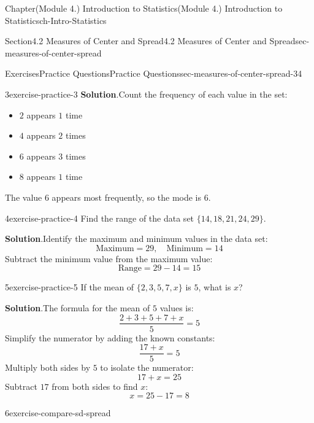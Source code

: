 \documentclass[oneside,10pt,]{book}
\newcommand{\blocktitlefont}{\relax}
\newcommand{\ptxlistdisc}{\raisebox{0.3ex}{\textbullet}}
\begin{document}
\begin{chapterptx}{Chapter}{(Module 4.) Introduction to Statistics}{}{(Module 4.) Introduction to Statistics}{}{}{ch-Intro-Statistics}
\begin{sectionptx}{Section}{4.2 Measures of Center and Spread}{}{4.2 Measures of Center and Spread}{}{}{sec-measures-of-center-spread}
\begin{exercises-subsection}{Exercises}{Practice Questions}{}{Practice Questions}{}{}{sec-measures-of-center-spread-34}
\begin{divisionexercise}{3}{}{}{exercise-practice-3}
\noindent\textbf{\blocktitlefont Solution}.\hypertarget{exercise-practice-3-2}{}\quad{}Count the frequency of each value in the set:%
\begin{itemize}[label=\ptxlistdisc]
\item{}\(2\) appears \(1\) time%
\item{}\(4\) appears \(2\) times%
\item{}\(6\) appears \(3\) times%
\item{}\(8\) appears \(1\) time%
\end{itemize}
The value \(6\) appears most frequently, so the mode is \(6\).%
\end{divisionexercise}%
\begin{divisionexercise}{4}{}{}{exercise-practice-4}%
Find the range of the data set \(\{14, 18, 21, 24, 29\}\).%
\par\smallskip%
\noindent\textbf{\blocktitlefont Solution}.\hypertarget{exercise-practice-4-2}{}\quad{}Identify the maximum and minimum values in the data set:%
\begin{equation*}
\text{Maximum} = 29, \quad \text{Minimum} = 14
\end{equation*}
Subtract the minimum value from the maximum value:%
\begin{equation*}
\text{Range} = 29 - 14 = 15
\end{equation*}
%
\end{divisionexercise}%
\begin{divisionexercise}{5}{}{}{exercise-practice-5}%
If the mean of \(\{2, 3, 5, 7, x\}\) is \(5\), what is \(x\)?%
\par\smallskip%
\noindent\textbf{\blocktitlefont Solution}.\hypertarget{exercise-practice-5-2}{}\quad{}The formula for the mean of \(5\) values is:%
\begin{equation*}
\frac{2 + 3 + 5 + 7 + x}{5} = 5
\end{equation*}
Simplify the numerator by adding the known constants:%
\begin{equation*}
\frac{17 + x}{5} = 5
\end{equation*}
Multiply both sides by \(5\) to isolate the numerator:%
\begin{equation*}
17 + x = 25
\end{equation*}
Subtract \(17\) from both sides to find \(x\):%
\begin{equation*}
x = 25 - 17 = 8
\end{equation*}
%
\end{divisionexercise}%
\begin{divisionexercise}{6}{}{}{exercise-compare-sd-spread}%

\end{divisionexercise}
\end{exercises-subsection}
\end{sectionptx}
\end{chapterptx}
\end{document}
